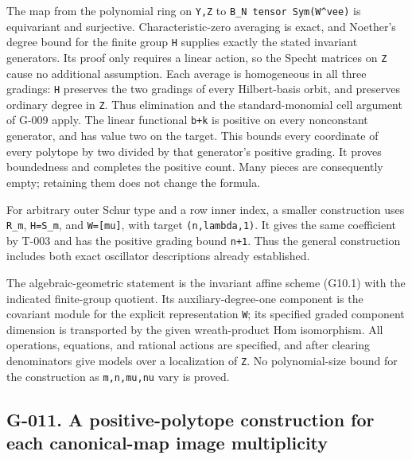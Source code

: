 \documentclass[
  10pt,
]{article}
\begin{document}
The map from the polynomial ring on \texttt{\small Y,\allowbreak{}Z} to
\texttt{\small B\_\allowbreak{}N tensor Sym(\allowbreak{}W\textasciicircum{}vee)\allowbreak{}}
is equivariant and surjective. Characteristic-zero averaging is exact,
and Noether's degree bound for the finite group \texttt{\small H}
supplies exactly the stated invariant generators. Its proof only
requires a linear action, so the Specht matrices on \texttt{\small Z}
cause no additional assumption. Each average is homogeneous in all three
gradings: \texttt{\small H} preserves the two gradings of every
Hilbert-basis orbit, and preserves ordinary degree in \texttt{\small Z}.
Thus elimination and the standard-monomial cell argument of G-009 apply.
The linear functional \texttt{\small b+\allowbreak{}k} is positive on
every nonconstant generator, and has value two on the target. This
bounds every coordinate of every polytope by two divided by that
generator's positive grading. It proves boundedness and completes the
positive count. Many pieces are consequently empty; retaining them does
not change the formula.

For arbitrary outer Schur type and a row inner index, a smaller
construction uses \texttt{\small R\_\allowbreak{}m},
\texttt{\small H=\allowbreak{}S\_\allowbreak{}m}, and
\texttt{\small W=\allowbreak{}[\allowbreak{}mu]\allowbreak{}}, with
target
\texttt{\small (\allowbreak{}n,\allowbreak{}lambda,\allowbreak{}1)\allowbreak{}}.
It gives the same coefficient by T-003 and has the positive grading
bound \texttt{\small n+\allowbreak{}1}. Thus the general construction
includes both exact oscillator descriptions already established.

The algebraic-geometric statement is the invariant affine scheme (G10.1)
with the indicated finite-group quotient. Its auxiliary-degree-one
component is the covariant module for the explicit representation
\texttt{\small W}; its specified graded component dimension is
transported by the given wreath-product Hom isomorphism. All operations,
equations, and rational actions are specified, and after clearing
denominators give models over a localization of \texttt{\small Z}. No
polynomial-size bound for the construction as
\texttt{\small m,\allowbreak{}n,\allowbreak{}mu,\allowbreak{}nu} vary is
proved.

\subsection{G-011. A positive-polytope construction for each
canonical-map image
multiplicity}\label{g-011.-a-positive-polytope-construction-for-each-canonical-map-image-multiplicity}
\end{document}
